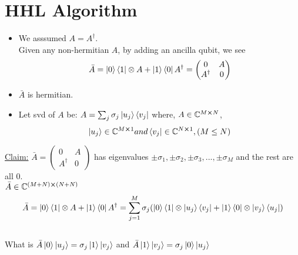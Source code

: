 \documentclass[11.5pt, paper=a4]{article}
\theoremstyle{definition}
\numberwithin{theorem}{section}
\begin{document}
\section{HHL Algorithm}
\begin{itemize}
    \item We asssumed $A = A^{\dagger}$.\\
    Given any non-hermitian $A$, by adding an ancilla qubit, we see\\
    $$ \bar{A} = \ket{0}\bra{1} \otimes A + \ket{1}\bra{0} A^{\dagger} = \begin{pmatrix}0 & A \\A^{\dagger} & 0 \end{pmatrix}$$
    \item $\bar{A}$ is hermitian.
    \item Let svd of $A$ be:
    $A =  \sum_{j}^{} \sigma_{j}\ket{u_{j}}\bra{v_{j}} $ where, $A \in \mathbb{C}^{M \cross N}$,
    $$\ket{u_{j}} \in \mathbb{C}^{M \cross 1} and \bra{v_{j}} \in \mathbb{C}^{N \cross 1}, (M \leq N)$$
\end{itemize}
\underline{Claim:} $ \bar{A} = \begin{pmatrix}0 & A \\A^{\dagger} & 0 \end{pmatrix} $ has eigenvalues $ \pm \sigma_{1},  \pm \sigma_{2}, \pm \sigma_{3}, ... , \pm \sigma_{M}$ and the rest are all 0.\\
$\bar{A} \in \mathbb{C}^{(M+N) \cross (N+N)}$\\
$$ \bar{A} =  \ket{0}\bra{1} \otimes A + \ket{1}\bra{0} A^{\dagger} = \sum_{j=1}^{M}\sigma_{j}(\ket{0}\bra{1} \otimes \ket{u_{j}}\bra{v_{j}} + \ket{1}\bra{0} \otimes \ket{v_{j}}\bra{u_{j}})$$\\
What is $ \bar{A} \ket{0} \ket{u_{j}} = \sigma_{j} \ket{1} \ket{v_{j}}$ and $ \bar{A} \ket{1} \ket{v_{j}} = \sigma_{j} \ket{0} \ket{u_{j}} $
\end{document}
